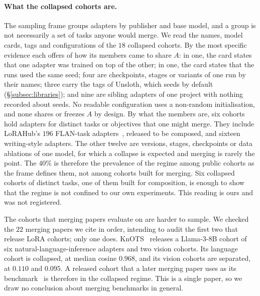 \paragraph{What the collapsed cohorts are.} The sampling frame groups adapters
by publisher and base model, and a group is not necessarily a set of tasks
anyone would merge. We read the names, model cards, tags and configurations of
the $18$ collapsed cohorts. By the most specific evidence each offers of how
its members came to share $A$: in one, the card states that one adapter was
trained on top of the other; in one, the card states that the runs used the
same seed; four are checkpoints, stages or variants of one run by their names;
three carry the tags of Unsloth, which seeds by default
(\S\ref{subsec:libraries}); and nine are sibling adapters of one project with
nothing recorded about seeds. No readable configuration uses a non-random
initialisation, and none shares or freezes $A$ by design. By what the members
are, six cohorts hold adapters for distinct tasks or objectives that one might
merge. They include LoRAHub's $196$ FLAN-task adapters~\citep{huang2024lorahub},
released to be composed, and sixteen writing-style adapters. The other twelve
are versions, stages, checkpoints or data ablations of one model, for which a
collapse is expected and merging is rarely the point. The $40\%$ is therefore
the prevalence of the regime among public cohorts as the frame defines them,
not among cohorts built for merging. Six collapsed cohorts of distinct tasks,
one of them built for composition, is enough to show that the regime is not
confined to our own experiments. This reading is ours and was not registered.

The cohorts that merging papers evaluate on are harder to sample. We checked the
$22$ merging papers we cite in order, intending to audit the first two that
release LoRA cohorts; only one does. KnOTS~\citep{stoica2025knots} releases a
Llama-3-8B cohort of six natural-language-inference adapters and two vision
cohorts. Its language cohort is collapsed, at median cosine $0.968$, and its
vision cohorts are separated, at $0.110$ and $0.095$. A released cohort that a
later merging paper uses as its benchmark~\citep{panariello2025core} is
therefore in the collapsed regime. This is a single paper, so we draw no
conclusion about merging benchmarks in general.
